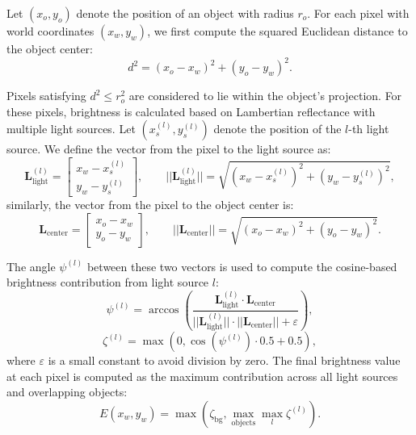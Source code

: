 Let $(x_o, y_o)$ denote the position of an object with radius $r_o$. For each pixel with world coordinates $(x_w, y_w)$, we first compute the squared Euclidean distance to the object center:
\begin{equation}
d^2 = (x_o - x_w)^2 + (y_o - y_w)^2.
\end{equation}

Pixels satisfying $d^2 \leq r_o^2$ are considered to lie within the object’s projection. For these pixels, brightness is calculated based on Lambertian reflectance with multiple light sources. Let $(x^{(l)}_s, y^{(l)}_s)$ denote the position of the $l$-th light source. We define the vector from the pixel to the light source as:
\begin{equation}
\mathbf{L}_{\text{light}}^{(l)} = 
\begin{bmatrix}
x_w - x^{(l)}_s \\
y_w - y^{(l)}_s
\end{bmatrix}, \qquad
||\mathbf{L}_{\text{light}}^{(l)}|| = \sqrt{(x_w - x^{(l)}_s)^2 + (y_w - y^{(l)}_s)^2},
\end{equation}
similarly, the vector from the pixel to the object center is:
\begin{equation}
\mathbf{L}_{\text{center}} = 
\begin{bmatrix}
x_o - x_w \\
y_o - y_w
\end{bmatrix}, \qquad
||\mathbf{L}_{\text{center}}|| = \sqrt{(x_o - x_w)^2 + (y_o - y_w)^2}.
\end{equation}

The angle $\psi^{(l)}$ between these two vectors is used to compute the cosine-based brightness contribution from light source $l$:
\begin{equation}
\psi^{(l)} = \arccos\left(\frac{\mathbf{L}_{\text{light}}^{(l)} \cdot \mathbf{L}_{\text{center}}}{||\mathbf{L}_{\text{light}}^{(l)}|| \cdot ||\mathbf{L}_{\text{center}}|| + \varepsilon}\right),
\end{equation}
\begin{equation}
\zeta^{(l)} = \max\left(0, \cos(\psi^{(l)}) \cdot 0.5 + 0.5\right),
\end{equation}
where $\varepsilon$ is a small constant to avoid division by zero. The final brightness value at each pixel is computed as the maximum contribution across all light sources and overlapping objects:
\begin{equation}
E(x_w, y_w) = \max\left( \zeta_{\text{bg}}, \max_{\text{objects}} \max_l \zeta^{(l)} \right).
\end{equation}

